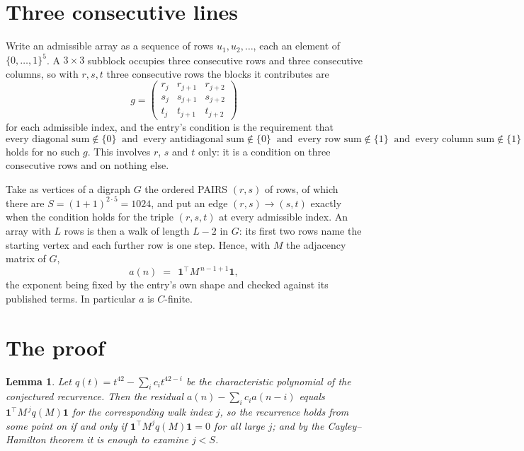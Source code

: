 \documentclass[11pt,a4paper]{article}
\theoremstyle{plain}
\newtheorem{lemma}[theorem]{Lemma}
\theoremstyle{definition}
\begin{document}
\section{Three consecutive lines}

Write an admissible array as a sequence of rows $u_1,u_2,\dots$, each an element of
$\{0,\dots,1\}^{5}$. A $3\times3$ subblock occupies three consecutive rows and
three consecutive columns, so with $r,s,t$ three consecutive rows the blocks it
contributes are
\[
g=\begin{pmatrix}r_j&r_{j+1}&r_{j+2}\\ s_j&s_{j+1}&s_{j+2}\\ t_j&t_{j+1}&t_{j+2}\end{pmatrix}
\]
for each admissible index, and the entry's condition is the requirement that
\[
\text{every diagonal sum} \notin \{0\}\ \text{ and }\ \text{every antidiagonal sum} \notin \{0\}\ \text{ and }\ \text{every row sum} \notin \{1\}\ \text{ and }\ \text{every column sum} \notin \{1\}
\]
holds for no such $g$. This involves $r$, $s$ and $t$ only: it is a condition on
three consecutive rows and on nothing else.

Take as vertices of a digraph $G$ the ordered PAIRS $(r,s)$ of rows, of which there are
$S=(1+1)^{2\cdot5}=1024$, and put an edge $(r,s)\to(s,t)$ exactly when the condition
holds for the triple $(r,s,t)$ at every admissible index. An array with $L$ rows is then a
walk of length $L-2$ in $G$: its first two rows name the starting vertex and each further
row is one step. Hence, with $M$ the adjacency matrix of $G$,
\[
a(n)\;=\;\,\mathbf{1}^{\!\top}M^{\,n-1+1}\mathbf{1},
\]
the exponent being fixed by the entry's own shape and checked against its published terms.
In particular $a$ is $C$-finite.

\section{The proof}

\begin{lemma}\label{lem:crit}
Let $q(t)=t^{42}-\sum_i c_it^{42-i}$ be the characteristic polynomial of the
conjectured recurrence. Then the residual $a(n)-\sum_ic_ia(n-i)$ equals
$\mathbf{1}^{\!\top}M^{\,j}q(M)\mathbf{1}$ for the corresponding walk index
$j$, so the recurrence holds from some point on if and only if
$\mathbf{1}^{\!\top}M^{j}q(M)\mathbf{1}=0$ for all large $j$; and by the
Cayley--Hamilton theorem it is enough to examine $j<S$.
\end{lemma}
\end{document}
